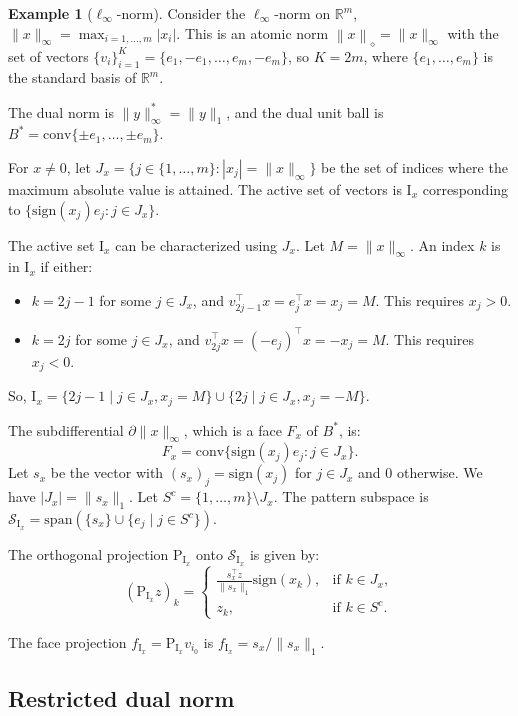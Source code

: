 \documentclass[12pt]{amsart}
\numberwithin{equation}{section}
\numberwithin{equation}{section}
\theoremstyle{definition}
\newtheorem{example}[thm]{Example}
\newcommand{\R}{\mathbb{R}}
\newcommand{\I}{\mathrm{I}}
\newcommand{\poly}[1]{\left\|#1\right\|_\diamond}
\newcommand{\PP}{\mathrm{P}}
\renewcommand{\SS}{\mathcal{S}}
\begin{document}
\begin{example}[$\ell_\infty$-norm]\label{ex:linfty}
Consider the $\ell_\infty$-norm on $\R^m$, $\|x\|_\infty = \max_{i=1,\ldots,m} |x_i|$. 
This is an atomic norm $\poly{x} = \|x\|_\infty$ with the set of vectors $\{v_i\}_{i=1}^K = \{e_1, -e_1, \ldots, e_m, -e_m\}$, so $K=2m$, where $\{e_1,\dots,e_m\}$ is the standard basis of $\R^m$.

The dual norm is $\|y\|_\infty^* = \|y\|_1$, and the dual unit ball is $B^* = \mathrm{conv}\{ \pm e_1, \ldots, \pm e_m\}$.

For $x \neq 0$, let $J_x = \{ j \in \{1, \ldots, m\} \colon |x_j| = \|x\|_\infty \}$ be the set of indices where the maximum absolute value is attained. 
The active set of vectors is $\I_x$ corresponding to $\{ \mathrm{sign}(x_j) e_j \colon  j \in J_x \}$.

The active set $\I_x$ can be characterized using $J_x$. Let $M=\|x\|_\infty$. An index $k$ is in $\I_x$ if either:
\begin{itemize}
	\item $k = 2j-1$ for some $j \in J_x$, and $v_{2j-1}^\top x = e_j^\top x = x_j = M$. This requires $x_j > 0$.
	\item $k = 2j$ for some $j \in J_x$, and $v_{2j}^\top x = (-e_j)^\top x = -x_j = M$. This requires $x_j < 0$.
\end{itemize}
So, $\I_x = \{ 2j-1 \mid j \in J_x, x_j = M \} \cup \{ 2j \mid j \in J_x, x_j = -M \}$.


The subdifferential $\partial \|x\|_\infty$, which is a face $F_x$ of $B^*$, is:
\[
F_x = \mathrm{conv}\{ \mathrm{sign}(x_j) e_j \colon j \in J_x \}.
\]
Let $s_x$ be the vector with $(s_x)_j = \mathrm{sign}(x_j)$ for $j \in J_x$ and $0$ otherwise. We have $|J_x| = \|s_x\|_1$. Let $S^c = \{1, \ldots, m\} \setminus J_x$.  The pattern subspace is $\SS_{\I_x} = \mathrm{span}(\{s_x\} \cup \{e_j \mid j \in S^c\})$.

The orthogonal projection $\PP_{\I_x}$ onto $\SS_{\I_x}$ is given by:
\[
(\PP_{\I_x} z)_k =
\begin{cases}
	\frac{ s_x^\top z }{\|s_x\|_1} \mathrm{sign}(x_k), & \mbox{if } k \in J_x, \\
	z_k, & \mbox{if } k \in S^c.
\end{cases}
\]

The face projection $f_{\I_x} = \PP_{\I_x} v_{i_0}$ is $f_{\I_x} = s_x/\|s_x\|_1$.
 \end{example}

 
\subsection{Restricted dual norm}\label{sec:restricted}
\end{document}
